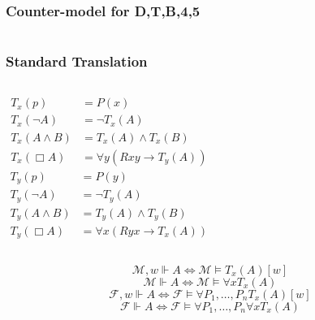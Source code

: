 \documentclass[UTF8,aspectratio=43,11pt,colorlinks,compress,openany]{beamer}%
\begin{document}
\begin{frame}\frametitle{Counter-model for D,T,B,4,5}
	\begin{columns}
			\centering{}
			\centering{}
			\centering{}
	\end{columns}\vspace{2cm}
	\begin{columns}
			\centering{}
			\centering{}
	\end{columns}
\end{frame}

\begin{frame}\frametitle{Standard Translation}
\setlength\abovedisplayskip{0pt}
\setlength\belowdisplayskip{0pt}
	\begin{definition}
		\begin{columns}
			\column{0.5\textwidth}
				\begin{align*}
				T_x(p)&=P(x)\\
				T_x(\neg A)&=\neg T_x(A)\\
				T_x(A\wedge B)&=T_x(A)\wedge T_x(B)\\
				T_x(\Box A)&=\forall y(Rxy\to T_y(A))
				\end{align*}
			\column{0.5\textwidth}
				\begin{align*}
				T_y(p)&=P(y)\\
				T_y(\neg A)&=\neg T_y(A)\\
				T_y(A\wedge B)&=T_y(A)\wedge T_y(B)\\
				T_y(\Box A)&=\forall x(Ryx\to T_x(A))
				\end{align*}
		\end{columns}
	\end{definition}
	\begin{theorem}
		\[\mathcal{M},w\Vdash A\iff\mathcal{M}\vDash T_x(A)[w]\]
		\[\mathcal{M}\Vdash A\iff\mathcal{M}\vDash\forall x T_x(A)\]
		\[\mathcal{F},w\Vdash A\iff\mathcal{F}\vDash \forall P_1,\dots,P_nT_x(A)[w]\]
		\[\mathcal{F}\Vdash A\iff\mathcal{F}\vDash\forall P_1,\dots,P_n\forall x T_x(A)\]
	\end{theorem}
\end{frame}
\end{document}
